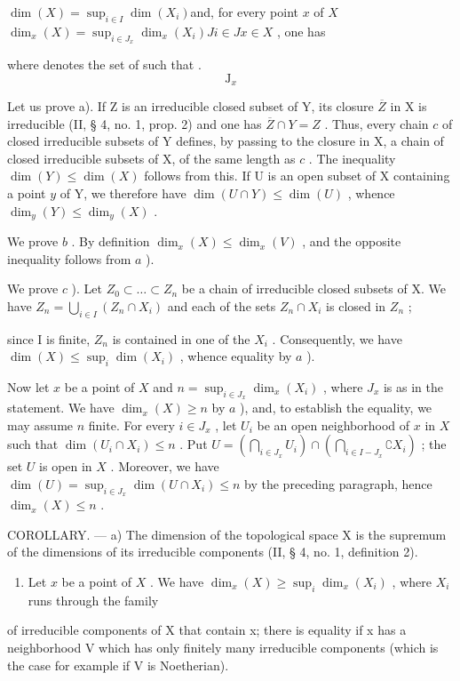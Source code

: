 \(\dim(X) = \sup_{i \in I} \dim(X_i)\)and, for every point \(x\) of \(X\)\(\dim_x(X) = \sup_{i \in J_x} \dim_x(X_i)\)\(J\)\(i \in J\)\(x \in X\) , one has

where  denotes the set of  such that .\[
\mathrm{J} _ {x}
\]

Let us prove a). If Z is an irreducible closed subset of Y, its closure \(\overline{Z}\) in X is irreducible (II, § 4, no. 1, prop. 2) and one has \(\overline{Z} \cap Y = Z\) . Thus, every chain \(c\) of closed irreducible subsets of Y defines, by passing to the closure in X, a chain of closed irreducible subsets of X, of the same length as \(c\) . The inequality \(\dim(Y) \leqslant \dim(X)\) follows from this. If U is an open subset of X containing a point \(y\) of Y, we therefore have \(\dim(U \cap Y) \leqslant \dim(U)\) , whence \(\dim_y(Y) \leqslant \dim_y(X)\) .

We prove \(b\) . By definition \(\dim_{x}(X) \leqslant \dim_{x}(V)\) , and the opposite inequality follows from \(a\) ).

We prove \(c\) ). Let \(Z_{0} \subset \ldots \subset Z_{n}\) be a chain of irreducible closed subsets of X. We have \(Z_{n} = \bigcup_{i \in I} (Z_{n} \cap X_{i})\) and each of the sets \(Z_{n} \cap X_{i}\) is closed in \(Z_{n}\) ;

since I is finite, \(Z_{n}\) is contained in one of the \(X_{i}\) . Consequently, we have \(\dim(X) \leqslant \sup_{i} \dim(X_{i})\) , whence equality by \(a\) ).

Now let \(x\) be a point of \(X\) and \(n = \sup_{i \in J_x} \dim_x(X_i)\) , where \(J_x\) is as in the statement. We have \(\dim_x(X) \geqslant n\) by \(a\) ), and, to establish the equality, we may assume \(n\) finite. For every \(i \in J_x\) , let \(U_i\) be an open neighborhood of \(x\) in \(X\) such that \(\dim(U_i \cap X_i) \leqslant n\) . Put \(U = (\bigcap_{i \in J_x} U_i) \cap (\bigcap_{i \in I - J_x} \complement X_i)\) ; the set \(U\) is open in \(X\) . Moreover, we have \(\dim(U) = \sup_{i \in J_x} \dim(U \cap X_i) \leqslant n\) by the preceding paragraph, hence \(\dim_x(X) \leqslant n\) .

COROLLARY. --- a) The dimension of the topological space X is the supremum of the dimensions of its irreducible components (II, § 4, no. 1, definition 2).

\begin{enumerate}
\def\labelenumi{\alph{enumi})}
\setcounter{enumi}{1}
\tightlist
\item
  Let \(x\) be a point of \(X\) . We have \(\dim_x(X) \geqslant \sup_i \dim_x(X_i)\) , where \(X_i\) runs through the family
\end{enumerate}
of irreducible components of X that contain x; there is equality if x has a neighborhood V which has only finitely many irreducible components (which is the case for example if V is Noetherian).


